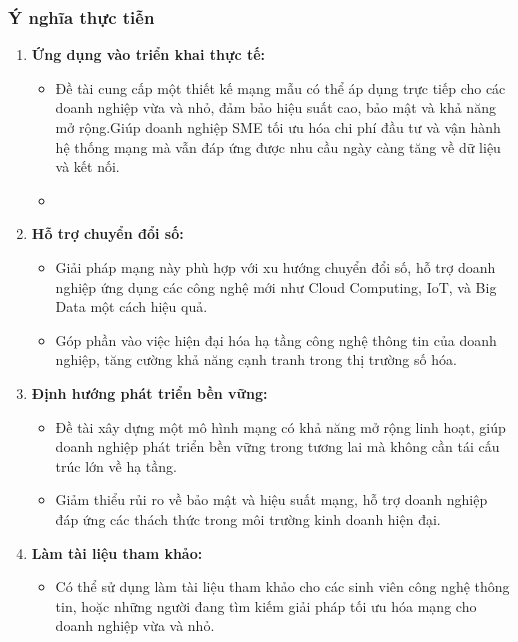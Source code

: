 \documentclass[13pt]{article}
\begin{document}
    \subsubsection{Ý nghĩa thực tiễn}
    \begin{enumerate}
        \item \textbf{Ứng dụng vào triển khai thực tế:}
            \begin{itemize}
                \item Đề tài cung cấp một thiết kế mạng mẫu có thể áp dụng trực tiếp cho các doanh nghiệp vừa và nhỏ, đảm bảo hiệu suất cao, bảo mật và khả năng mở rộng.Giúp doanh nghiệp SME tối ưu hóa chi phí đầu tư và vận hành hệ thống mạng mà vẫn đáp ứng được nhu cầu ngày càng tăng về dữ liệu và kết nối.
                \item 
            \end{itemize}
        \item \textbf{Hỗ trợ chuyển đổi số:}
            \begin{itemize}
                \item Giải pháp mạng này phù hợp với xu hướng chuyển đổi số, hỗ trợ doanh nghiệp ứng dụng các công nghệ mới như Cloud Computing, IoT, và Big Data một cách hiệu quả.
                \item Góp phần vào việc hiện đại hóa hạ tầng công nghệ thông tin của doanh nghiệp, tăng cường khả năng cạnh tranh trong thị trường số hóa.
            \end{itemize}
        \item \textbf{Định hướng phát triển bền vững:}
            \begin{itemize}
                \item Đề tài xây dựng một mô hình mạng có khả năng mở rộng linh hoạt, giúp doanh nghiệp phát triển bền vững trong tương lai mà không cần tái cấu trúc lớn về hạ tầng.
                \item Giảm thiểu rủi ro về bảo mật và hiệu suất mạng, hỗ trợ doanh nghiệp đáp ứng các thách thức trong môi trường kinh doanh hiện đại.
            \end{itemize}
        \item \textbf{Làm tài liệu tham khảo:}
            \begin{itemize}
                \item Có thể sử dụng làm tài liệu tham khảo cho các sinh viên công nghệ thông tin, hoặc những người đang tìm kiếm giải pháp tối ưu hóa mạng cho doanh nghiệp vừa và nhỏ.
            \end{itemize}
    \end{enumerate}
\end{document}
